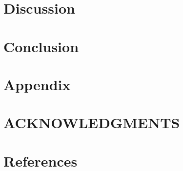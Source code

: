 \documentclass[reprint,english,notitlepage]{revtex4-2}
\begin{document}
\section{Discussion} \label{sec: discussion}

\section{Conclusion} \label{sec: conclusion}

\section{Appendix} \label{sec: appendix}

\section*{ACKNOWLEDGMENTS}

\section*{References} \label{sec: references}
\end{document}
